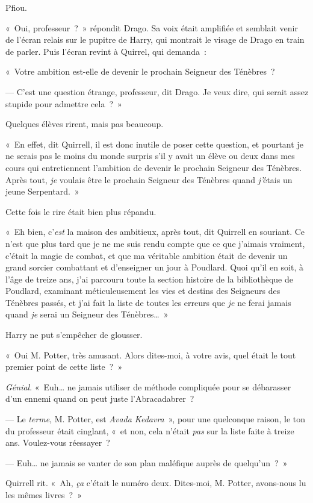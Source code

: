 Pfiou.

«~Oui, professeur~?~» répondit Drago.
Sa voix était amplifiée et semblait venir de l'écran relais sur le pupitre de Harry, qui montrait le visage de Drago en train de parler.
Puis l'écran revint à Quirrel, qui demanda~:

«~Votre ambition est-elle de devenir le prochain Seigneur des Ténèbres~?

--- C'est une question étrange, professeur, dit Drago.
Je veux dire, qui serait assez stupide pour admettre cela~?~»

Quelques élèves rirent, mais pas beaucoup.

«~En effet, dit Quirrell, il est donc inutile de poser cette question, et pourtant je ne serais pas le moins du monde surpris s'il y avait un élève ou deux dans mes cours qui entretiennent l'ambition de devenir le prochain Seigneur des Ténèbres.
Après tout, \emph{je} voulais être le prochain Seigneur des Ténèbres quand \emph{j'}étais un jeune Serpentard.~»

Cette fois le rire était bien plus répandu.

«~Eh bien, c'\emph{est} la maison des ambitieux, après tout, dit Quirrell en souriant.
Ce n'est que plus tard que je ne me suis rendu compte que ce que j'aimais vraiment, c'était la magie de combat, et que ma véritable ambition était de devenir un grand sorcier combattant et d'enseigner un jour à Poudlard.
Quoi qu'il en soit, à l'âge de treize ans, j'ai parcouru toute la section histoire de la bibliothèque de Poudlard, examinant méticuleusement les vies et destins des Seigneurs des Ténèbres passés, et j'ai fait la liste de toutes les erreurs que \emph{je} ne ferai jamais quand \emph{je} serai un Seigneur des Ténèbres…~»

Harry ne put s'empêcher de glousser.

«~Oui M. Potter, très amusant.
Alors dites-moi, à votre avis, quel était le tout premier point de cette liste~?~»

\emph{Génial}.
«~Euh… ne jamais utiliser de méthode compliquée pour se débarasser d'un ennemi quand on peut juste l'Abracadabrer~?

--- Le \emph{terme}, M. Potter, est \emph{Avada Kedavra}~», pour une quelconque raison, le ton du professeur était cinglant, «~et non, cela n'était \emph{pas} sur la liste faite à treize ans.
Voulez-vous réessayer~?

--- Euh… ne jamais se vanter de son plan maléfique auprès de quelqu'un~?~»

Quirrell rit.
«~Ah, \emph{ça} c'était le numéro deux.
Dites-moi, M. Potter, avons-nous lu les mêmes livres~?~»

